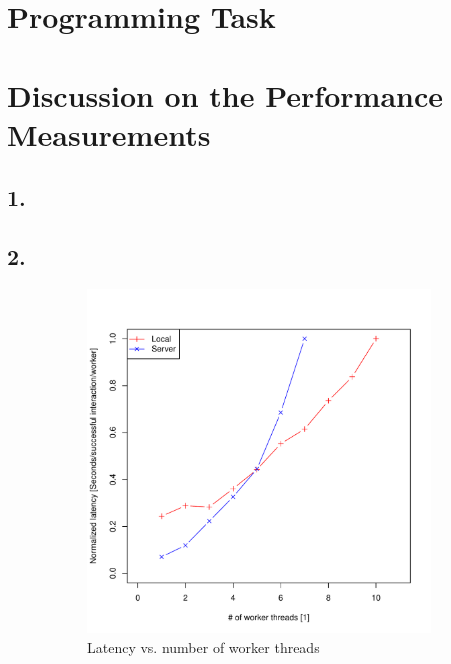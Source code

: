 \documentclass[12pt]{article}
\begin{document}
\section*{Programming Task}
\section*{Discussion on the Performance Measurements}
\subsection*{1.}
\subsection*{2.}

\begin{figure}[htbp]
\begin{subfigure}[t]{0.5\textwidth}
\centering
\includegraphics[scale=0.4]{latency.pdf}
\caption{Latency vs. number of worker threads}
\end{subfigure}
\begin{subfigure}[t]{0.5\textwidth}
\centering

\end{subfigure}
\end{figure}
\end{document}
